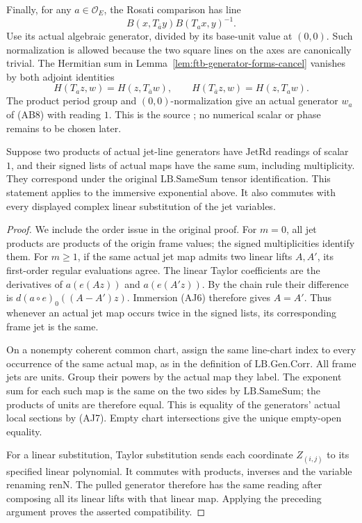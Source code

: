 Finally, for any \(a\in\mathcal O_E\), the Rosati comparison
has line
\[
                              B(x,T_{\bar a}y)B(T_ax,y)^{-1}.
                                                               \tag{AB8}
\]
Use its actual algebraic generator, divided by its base-unit
value at \((0,0)\). Such normalization is allowed because
the two square lines on the axes are canonically trivial.
The Hermitian sum in Lemma~\ref{lem:ftb-generator-forms-cancel}
vanishes by both adjoint identities
\[
 H(T_az,w)=H(z,T_{\bar a}w),\qquad
 H(T_{\bar a}z,w)=H(z,T_aw).
\]
The product period group and \((0,0)\)-normalization give an
actual generator \(w_a\) of (AB8) with reading \(1\).
This is the source ;
no numerical scalar or phase remains to be chosen later.

\begin{srlemma}
\label{lem:ftb-actual-jet-reading-corr}
Suppose two products of actual jet-line generators have
\(\mathrm{JetRd}\) readings of scalar \(1\), and their signed
lists of actual maps have the same sum, including multiplicity.
They correspond under the original \(\mathrm{LB.SameSum}\)
tensor identification.
This statement applies to the immersive exponential above.
It also commutes with every displayed complex linear
substitution of the jet variables.
\end{srlemma}

\begin{proof}
We include the order issue in the original proof.
For \(m=0\), all jet products are products of the origin frame
values; the signed multiplicities identify them.
For \(m\geq1\), if the same actual jet map admits two linear
lifts \(A,A'\), its first-order regular evaluations agree.
The linear Taylor coefficients are the derivatives of
\(a(e(Az))\) and \(a(e(A'z))\).
By the chain rule their difference is
\(d(a\circ e)_0((A-A')z)\).
Immersion (AJ6) therefore gives \(A=A'\).
Thus whenever an actual jet map occurs twice in the signed
lists, its corresponding frame jet is the same.

On a nonempty coherent common chart, assign the same line-chart
index to every occurrence of the same actual map, as in the
definition of \(\mathrm{LB.Gen.Corr}\). All frame jets are units.
Group their powers by the actual map they label.
The exponent sum for each such map is the same on the two
sides by \(\mathrm{LB.SameSum}\); the products of units are
therefore equal. This is equality of the generators'
actual local sections by (AJ7). Empty chart intersections
give the unique empty-open equality.

For a linear substitution, Taylor substitution sends each
coordinate \(Z_{(i,j)}\) to its specified linear polynomial.
It commutes with products, inverses and the variable renaming
\(\mathrm{renN}\). The pulled generator therefore has the
same reading after composing all its linear lifts with that
linear map. Applying the preceding argument proves the
asserted compatibility.
\end{proof}

